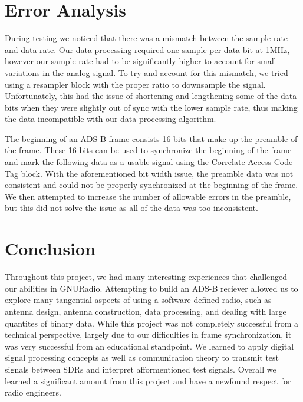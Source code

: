 \documentclass[conference, onecolumn]{IEEEtran}
\begin{document}
\section{Error Analysis}
During testing we noticed that there was a mismatch between the sample rate and data rate. Our data processing required one sample per data bit at 1MHz, however our sample rate had to be significantly higher to account for small variations in the analog signal. To try and account for this mismatch, we tried using a resampler block with the proper ratio to downsample the signal. Unfortunately, this had the issue of shortening and lengthening some of the data bits when they were slightly out of sync with the lower sample rate, thus making the data incompatible with our data processing algorithm.

The beginning of an ADS-B frame consists 16 bits that make up the preamble of the frame. These 16 bits can be used to synchronize the beginning of the frame and mark the following data as a usable signal using the Correlate Access Code-Tag block. With the aforementioned bit width issue, the preamble data was not consistent and could not be properly synchronized at the beginning of the frame. We then attempted to increase the number of allowable errors in the preamble, but this did not solve the issue as all of the data was too inconsistent.


\section{Conclusion}
Throughout this project, we had many interesting experiences that challenged our abilities in GNURadio. Attempting to build an ADS-B reciever allowed us to explore many tangential aspects of using a software defined radio, such as antenna design, antenna construction, data processing, and dealing with large quantites of binary data. While this project was not completely successful from a technical perspective, largely due to our difficulties in frame synchronization, it was very successful from an educational standpoint. We learned to apply digital signal processing concepts as well as communication theory to transmit test signals between SDRs and interpret afformentioned test signals. Overall we learned a significant amount from this project and have a newfound respect for radio engineers.





\end{document}
